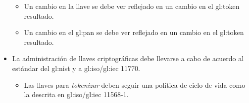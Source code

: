 \begin{itemize}
\begin{itemize}
    \item Un cambio en la llave se debe ver reflejado en un cambio en el
      \gls{gl:token} resultado.

    \item Un cambio en el \gls{gl:pan} se debe ver reflejado en un cambio en el
      \gls{gl:token} resultado.


  \end{itemize}





  \item La administración de llaves criptográficas debe llevarse a cabo de
    acuerdo al estándar del \gls{gl:nist} \cite{nist_llaves} y a
    \acrshort{gl:iso}/\acrshort{gl:iec} 11770.

  \begin{itemize}

    \item Las llaves para \textit{tokenizar} deben seguir una política de
      ciclo de vida como la descrita en  \acrshort{gl:iso}/\acrshort{gl:iec}
      11568-1.


\end{itemize}
\end{itemize}
